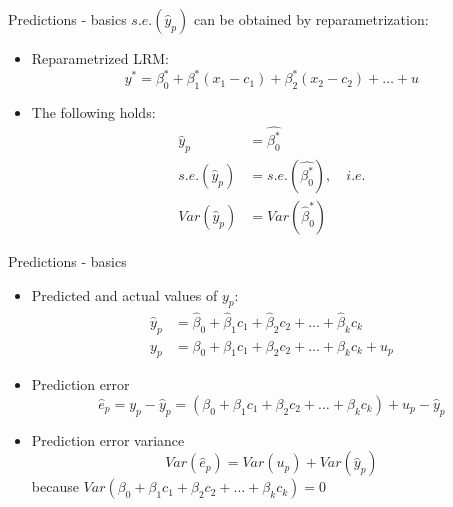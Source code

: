 \documentclass{beamer}
\begin{document}

\begin{frame}{Predictions - basics}
$\textit{s.e.}(\hat{y}_p)$ can be obtained by reparametrization:

\vspace{0.5cm}
\begin{itemize}
\item Reparametrized LRM:
$$y^*=\beta^*_0 + \beta^*_1 (x_1 -c_1) + \beta^*_2(x_2 - c_2) + \dots + u$$
\item The following holds:
\begin{align} \nonumber
 \hat{y}_p &= \hat{\beta_0^*} \\ \nonumber
 \textit{s.e.}(\hat{y}_p ) &= 
   \textit{s.e.}(\hat{\beta_0^*}), \quad i.e. \\ \nonumber
 Var(\hat{y}_p) &= Var(\hat{\beta}_0^*)
\end{align} 
\end{itemize}
\end{frame}


\begin{frame}{Predictions - basics}
\begin{itemize}
\item Predicted and actual values of $y_p$:
\begin{align}\nonumber
\hat{y}_p &  = \hat{\beta}_0 + \hat{\beta}_1 c_1 + \hat{\beta}_2 c_2 + \dots + \hat{\beta}_k c_k\\ \nonumber
y_p & = \beta_0 + \beta_1 c_1 + \beta_2 c_2 + \dots+\beta_k c_k + u_p \nonumber
\end{align} 
\item Prediction error
$$\hat{e}_p = y_p - \hat{y}_p = (\beta_0 + \beta_1 c_1 + \beta_2 c_2 + \dots+\beta_k c_k) + u_p - \hat{y}_p$$
\item Prediction error variance
$$Var(\hat{e}_p) = Var(u_p) + Var(\hat{y}_p)$$
because $Var(\beta_0 + \beta_1 c_1 + \beta_2 c_2 + \dots+\beta_k c_k)=0$
\end{itemize}
\end{frame}

\end{document}
